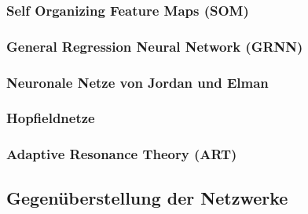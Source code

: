 \subsubsection{Self Organizing Feature Maps (SOM)}

\subsubsection{General Regression Neural Network (GRNN)}

\subsubsection{Neuronale Netze von Jordan und Elman}%

\subsubsection{Hopfieldnetze}%

\subsubsection{Adaptive Resonance Theory (ART)}%

\subsection{Gegenüberstellung der Netzwerke}
